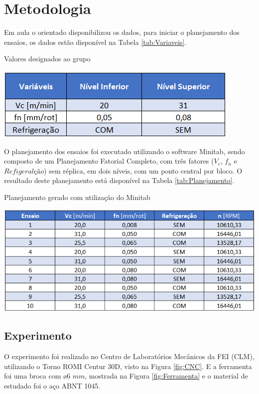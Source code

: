 \documentclass[deposito, acronym, symbols]{fei}
\begin{document}
\chapter{Metodologia}

Em aula o orientado disponibilizou os dados, para iniciar o planejamento dos ensaios, os dados estão disponível na Tabela \ref{tab:Variaveis}.

\begin{table}[!htb]
 \centering
    \caption{Valores designados ao grupo}
    \includegraphics[width=0.7\linewidth]{Imagens/Exp04_variaveis.png}
    \label{tab:Variaveis}
 \end{table}

O planejamento dos ensaios foi executado utilizando o software Minitab, sendo composto de um Planejamento Fatorial Completo, com três fatores ($V_c$, $f_n$ e $Refigeralção$) sem réplica, em dois níveis, com um ponto central por bloco. O resultado deste planejamento está disponível na Tabela \ref{tab:Planejamento}.

\begin{table}[!htb]
 \centering
    \caption{Planejamento gerado com utilização do Minitab}
    \includegraphics[width=0.9\linewidth]{Imagens/Exp04_planejamento.png}
    \label{tab:Planejamento}
 \end{table}

 \section{Experimento}

 O experimento foi realizado no Centro de Laboratórios Mecânicos da FEI (CLM), utilizando o Torno ROMI Centur 30D, visto na Figura \ref{fig:CNC}. E a ferramenta foi uma broca com ø6 $mm$, mostrada na Figura \ref{fig:Ferramenta} e o material de estudado foi o aço ABNT 1045.
\end{document}
